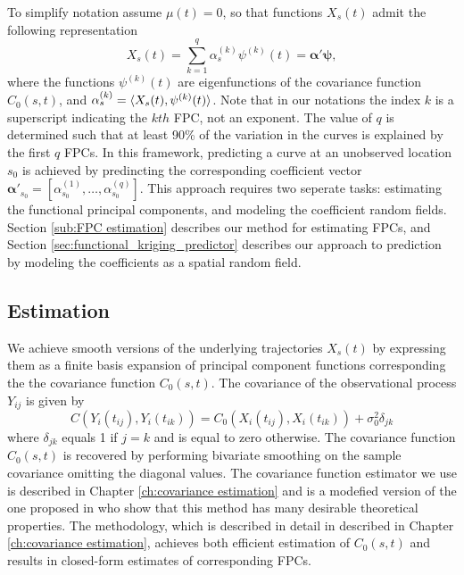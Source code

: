 To simplify notation assume $\mu(t)=0$, so that functions $X_s(t)$ admit the following representation 
\begin{equation}
	X_{s}(t) = \sum_{k=1}^{q} \alpha_{s}^{(k)}\psi^{(k)}(t) = \boldsymbol{\alpha'}\boldsymbol{\psi},
\end{equation}
where the functions $\psi^{(k)}(t)$ are eigenfunctions of the covariance function $C_0(s,t)$, and $\alpha_{s}^{(k)} = \langle X_s(t),  \psi^{(k)}(t) \rangle$. Note that in our notations the index $k$ is a superscript indicating the $kth$ FPC, not an exponent. The value of $q$ is determined such that at least 90\% of the variation in the curves is explained by the first $q$ FPCs. In this framework, predicting a curve at an unobserved location $s_0$ is achieved by predincting the corresponding coefficient vector $\boldsymbol{\alpha'}_{s_0}=[\alpha_{s_0}^{(1)}, \dots, \alpha_{s_0}^{(q)}]$. This approach requires two seperate tasks: estimating the functional principal components, and modeling the coefficient random fields. Section \ref{sub:FPC estimation} describes our method for estimating FPCs, and Section \ref{sec:functional_kriging_predictor} describes our approach to prediction by modeling the coefficients as a spatial random field.
\subsection{Estimation} %
\label{sub:estimation}

We achieve smooth versions of the underlying trajectories $X_s(t)$ by expressing them as a finite basis expansion of principal component functions corresponding the the covariance function $C_0(s,t)$. The covariance of the observational process $Y_{ij}$ is given by
\begin{equation}
	C(Y_i(t_{ij}), Y_i(t_{ik})) = C_0(X_i(t_{ij}), X_i(t_{ik})) + \sigma^2_0 \delta_{jk}
\end{equation}
where $\delta_{jk}$ equals 1 if $j=k$ and is equal to zero otherwise. The covariance function $C_0(s,t)$ is recovered by performing bivariate smoothing on the sample covariance omitting the diagonal values.  The covariance function estimator we use is described in Chapter \ref{ch:covariance estimation} and is a modefied version of the one proposed in \cite{Cai:2010vr} who show that this method has many desirable theoretical properties. The methodology, which is described in detail in described in Chapter \ref{ch:covariance estimation}, achieves both efficient estimation of $C_0(s,t)$ and results in closed-form estimates of corresponding FPCs.

